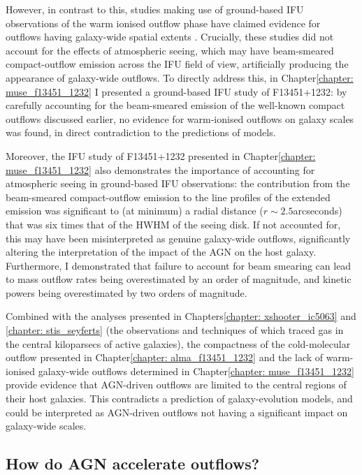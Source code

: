 However, in contrast to this, studies making use of ground-based IFU observations of the warm ionised outflow phase have claimed evidence for outflows having galaxy-wide spatial extents \citep{Fu2009, Westmoquette2012, Liu2014, McElroy2015, Wylezalek2017}. Crucially, these studies did not account for the effects of atmospheric seeing, which may have beam-smeared compact-outflow emission across the IFU field of view, artificially producing the appearance of galaxy-wide outflows. To directly address this, in Chapter\;\ref{chapter: muse_f13451_1232} I presented a ground-based IFU study of F13451+1232: by carefully accounting for the beam-smeared emission of the well-known compact outflows discussed earlier, no evidence for warm-ionised outflows on galaxy scales was found, in direct contradiction to the predictions of models.

Moreover, the IFU study of F13451+1232 presented in Chapter\;\ref{chapter: muse_f13451_1232} also demonstrates the importance of accounting for atmospheric seeing in ground-based IFU observations: the contribution from the beam-smeared compact-outflow emission to the line profiles of the extended emission was significant to (at minimum) a radial distance ($r\sim2.5$\;arcseconds) that was six times that of the HWHM of the seeing disk. If not accounted for, this may have been misinterpreted as genuine galaxy-wide outflows, significantly altering the interpretation of the impact of the AGN on the host galaxy. Furthermore, I demonstrated that failure to account for beam smearing can lead to mass outflow rates being overestimated by an order of magnitude, and kinetic powers being overestimated by two orders of magnitude.

Combined with the analyses presented in Chapters\;\ref{chapter: xshooter_ic5063} and \ref{chapter: stis_seyferts} (the observations and techniques of which traced gas in the central kiloparsecs of active galaxies), the compactness of the cold-molecular outflow presented in Chapter\;\ref{chapter: alma_f13451_1232} and the lack of warm-ionised galaxy-wide outflows determined in Chapter\;\ref{chapter: muse_f13451_1232} provide evidence that AGN-driven outflows are limited to the central regions of their host galaxies. This contradicts a prediction of galaxy-evolution models, and could be interpreted as AGN-driven outflows not having a significant impact on galaxy-wide scales.

\subsection{How do AGN accelerate outflows?}
\label{section: conclusions_and_future_work: acceleration_mechanisms}

